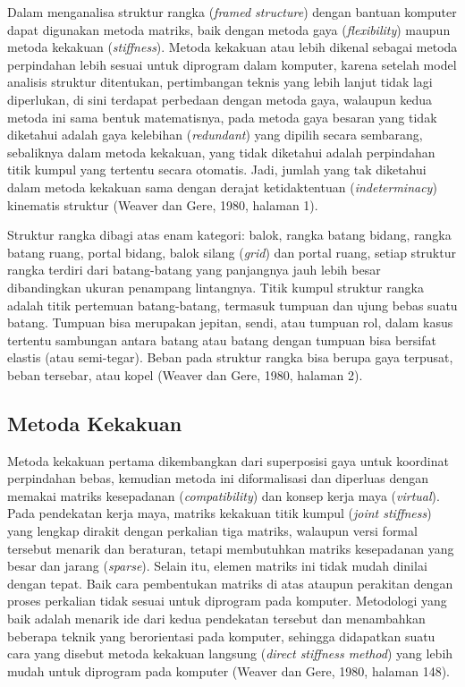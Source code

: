 Dalam menganalisa struktur rangka (\textit{framed structure}) dengan
bantuan komputer dapat digunakan metoda matriks, baik dengan metoda gaya
(\textit{flexibility}) maupun metoda kekakuan (\textit{stiffness}). Metoda
kekakuan atau lebih dikenal sebagai metoda perpindahan lebih sesuai untuk
diprogram dalam komputer, karena setelah model analisis struktur
ditentukan, pertimbangan teknis yang lebih lanjut tidak lagi diperlukan, di
sini terdapat perbedaan dengan metoda gaya, walaupun kedua metoda ini sama
bentuk matematisnya, pada metoda gaya besaran yang tidak diketahui adalah
gaya kelebihan (\textit{redundant}) yang dipilih secara sembarang,
sebaliknya dalam metoda kekakuan, yang tidak diketahui adalah perpindahan
titik kumpul yang tertentu secara otomatis. Jadi, jumlah yang tak diketahui
dalam metoda kekakuan sama dengan derajat ketidaktentuan
(\textit{indeterminacy}) kinematis struktur (Weaver dan Gere, 1980,
halaman 1).

Struktur rangka dibagi atas enam kategori: balok, rangka batang bidang,
rangka batang ruang, portal bidang, balok silang (\textit{grid}) dan portal
ruang, setiap struktur rangka terdiri dari batang-batang yang panjangnya
jauh lebih besar dibandingkan ukuran penampang lintangnya. Titik kumpul
struktur rangka adalah titik pertemuan batang-batang, termasuk tumpuan dan
ujung bebas suatu batang. Tumpuan bisa merupakan jepitan, sendi, atau
tumpuan rol, dalam kasus tertentu sambungan antara batang atau batang
dengan tumpuan bisa bersifat elastis (atau semi-tegar). Beban pada struktur
rangka bisa berupa gaya terpusat, beban tersebar, atau kopel (Weaver dan
Gere, 1980, halaman 2).

\subsection{Metoda Kekakuan}

Metoda kekakuan pertama dikembangkan dari superposisi gaya untuk koordinat
perpindahan bebas, kemudian metoda ini diformalisasi dan diperluas dengan
memakai matriks kesepadanan (\textit{compatibility}) dan konsep kerja maya
(\textit{virtual}). Pada pendekatan kerja maya, matriks kekakuan titik
kumpul (\textit{joint stiffness}) yang lengkap dirakit dengan perkalian
tiga matriks, walaupun versi formal tersebut menarik dan beraturan, tetapi
membutuhkan matriks kesepadanan yang besar dan jarang (\textit{sparse}).
Selain itu, elemen matriks ini tidak mudah dinilai dengan tepat. Baik cara
pembentukan matriks di atas ataupun perakitan dengan proses perkalian tidak
sesuai untuk diprogram pada komputer. Metodologi yang baik adalah menarik
ide dari kedua pendekatan tersebut dan menambahkan beberapa teknik yang
berorientasi pada komputer, sehingga didapatkan suatu cara yang disebut
metoda kekakuan langsung (\textit{direct stiffness method}) yang lebih
mudah untuk diprogram pada komputer (Weaver dan Gere, 1980, halaman 148).

